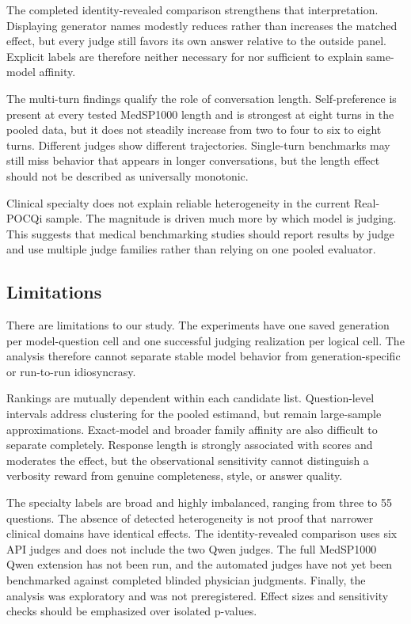 \documentclass[11pt]{article}
\begin{document}
The completed identity-revealed comparison strengthens that interpretation.
Displaying generator names modestly reduces rather than increases the matched
effect, but every judge still favors its own answer relative to the outside
panel. Explicit labels are therefore neither necessary for nor sufficient to
explain same-model affinity.

The multi-turn findings qualify the role of conversation length.
Self-preference is present at every tested MedSP1000
length and is strongest at eight turns in the pooled data, but it does not
steadily increase from two to four to six to eight turns. Different judges show
different trajectories. Single-turn benchmarks may still miss behavior that
appears in longer conversations, but the length effect should not be described
as universally monotonic.

Clinical specialty does not explain reliable heterogeneity in the current
Real-POCQi sample. The magnitude is driven much more by which model is judging.
This suggests that medical benchmarking studies should report results by judge
and use multiple judge families rather than relying on one pooled evaluator.

\subsection{Limitations}

There are limitations to our study. The experiments have one saved generation
per model-question cell and one
successful judging realization per logical cell. The analysis therefore cannot
separate stable model behavior from generation-specific or run-to-run
idiosyncrasy.

Rankings are mutually dependent within each candidate list. Question-level
intervals address clustering for the pooled estimand, but remain large-sample
approximations. Exact-model and broader family affinity are also difficult to
separate completely. Response length is strongly associated with scores and
moderates the effect, but the observational sensitivity cannot distinguish a
verbosity reward from genuine completeness, style, or answer quality.

The specialty labels are broad and highly imbalanced, ranging from three to 55
questions. The absence of detected heterogeneity is not proof that narrower
clinical domains have identical effects. The identity-revealed comparison uses
six API judges and does not include the two Qwen judges. The full MedSP1000 Qwen
extension has not been run, and the
automated judges have not yet been benchmarked against completed blinded
physician judgments. Finally, the analysis was exploratory and was
not preregistered. Effect sizes and sensitivity checks should be emphasized
over isolated p-values.
\end{document}
